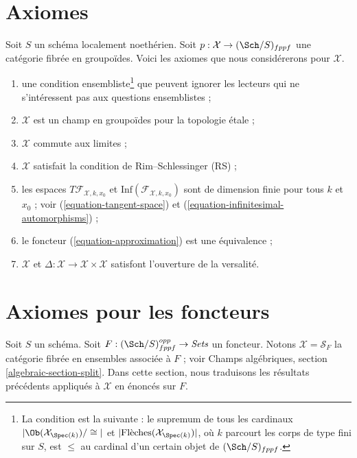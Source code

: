 \section{Axiomes}
\label{section-axioms}

\noindent
Soit $S$ un schéma localement noethérien. Soit
$p : \mathcal{X} \to (\Sch/S)_{fppf}$ une catégorie fibrée en groupoïdes.
Voici les axiomes que nous considérerons pour $\mathcal{X}$.
\begin{enumerate}
\item[{[-1]}] une condition ensembliste\footnote{La condition est la suivante :
le supremum de tous les cardinaux
$|\Ob(\mathcal{X}_{\Spec(k)})/\cong|$ et
$|\text{Flèches}(\mathcal{X}_{\Spec(k)})|$, où $k$ parcourt les corps de type
fini sur $S$, est $\leq$ au cardinal d'un certain objet de
$(\Sch/S)_{fppf}$.} que peuvent ignorer les lecteurs qui ne s'intéressent pas
aux questions ensemblistes ;
\item[{[0]}] $\mathcal{X}$ est un champ en groupoïdes pour la topologie étale ;
\item[{[1]}] $\mathcal{X}$ commute aux limites ;
\item[{[2]}] $\mathcal{X}$ satisfait la condition de Rim--Schlessinger (RS) ;
\item[{[3]}] les espaces $T\mathcal{F}_{\mathcal{X}, k, x_0}$ et
$\text{Inf}(\mathcal{F}_{\mathcal{X}, k, x_0})$
sont de dimension finie pour tous $k$ et $x_0$ ; voir
(\ref{equation-tangent-space}) et
(\ref{equation-infinitesimal-automorphisms}) ;
\item[{[4]}] le foncteur (\ref{equation-approximation}) est une équivalence ;
\item[{[5]}] $\mathcal{X}$ et
$\Delta : \mathcal{X} \to \mathcal{X} \times \mathcal{X}$ satisfont
l'ouverture de la versalité.
\end{enumerate}










\section{Axiomes pour les foncteurs}
\label{section-axioms-functors}

\noindent
Soit $S$ un schéma. Soit
$F : (\Sch/S)_{fppf}^{opp} \to \textit{Sets}$ un foncteur. Notons
$\mathcal{X} = \mathcal{S}_F$ la catégorie fibrée en ensembles associée à
$F$ ; voir Champs algébriques, section \ref{algebraic-section-split}. Dans
cette section, nous traduisons les résultats précédents appliqués à
$\mathcal{X}$ en énoncés sur $F$.

